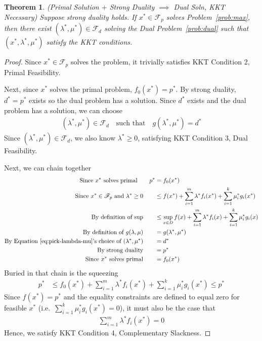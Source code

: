 \documentclass[12pt]{article}
\numberwithin{equation}{section} %
\theoremstyle{plain}
\newtheorem{thm}{Theorem}[section]
\theoremstyle{definition}
\theoremstyle{remark}
\begin{document}
\begin{thm}{\emph{(Primal Solution $+$ Strong Duality $\implies$ Dual
  Soln, KKT Necessary)}}
Suppose strong duality holds.  If $x^*\in\mathscr{F}_p$ solves
Problem~\ref{prob:max}, then there exist
$(\lambda^*,\mu^*)\in\mathscr{F}_d$ solving the Dual
Problem~\ref{prob:dual} such that $(x^*,\lambda^*,\mu^*)$ satisfy the
KKT conditions.
\end{thm}
\begin{proof}
Since $x^*\in\mathscr{F}_p$ solves the problem, it trivially satisfies
KKT Condition 2, Primal Feasibility.

Next, since $x^*$ solves the primal problem, $f_0(x^*)=p^*$. By strong
duality, $d^*=p^*$ exists so the dual problem has a solution. Since
$d^*$ exists and the dual problem has a solution, we can choose
\begin{align}
  \label{eq:pick-lambda-mu}
  (\lambda^*,\mu^*) \in \mathscr{F}_d
  \quad \text{such that}
  \quad g(\lambda^*,\mu^*) = d^*
\end{align}
Since $(\lambda^*,\mu^*)\in\mathscr{F}_d$, we also know $\lambda^*\geq
0$, satisfying KKT Condition 3, Dual Feasibility.

Next, we can chain together
\begin{align*}
  \text{Since $x^*$ solves primal} \qquad p^* &= f_0(x^*) \\
  \text{Since $x^*\in\mathscr{F}_p$ and $\lambda^*\geq 0$} \qquad
  &\leq f(x^*) + \sum^m_{i=1} \lambda^* f_i(x^*)
  + \sum^k_{i=1} \mu_i^* g_i(x^*) \\
  \text{By definition of sup} \qquad
  &\leq \sup_{x\in D} f(x) + \sum^m_{i=1} \lambda^* f_i(x)
  + \sum^k_{i=1} \mu_i^* g_i(x) \\
  \text{By definition of $g(\lambda,\mu)$} \qquad
  &= g(\lambda^*,\mu^*) \\
  \text{By Equation~\ref{eq:pick-lambda-mu}'s
    choice of $(\lambda^*,\mu^*)$} \qquad &= d^* \\
  \text{By strong duality}\qquad
  &= p^*\\
  \text{Since $x^*$ solves primal}\qquad
  &= f_0(x^*)
\end{align*}
Buried in that chain is the squeezing
\begin{align*}
  p^*
  &\leq f_0(x^*) + \sum^m_{i=1} \lambda^* f_i(x^*)
  + \sum^k_{i=1} \mu_i^* g_i(x^*)
  \leq p^*
\end{align*}
Since $f(x^*)=p^*$ and the equality constraints are defined to equal
zero for feasible $x^*$ (i.e.\ $\sum^k_{i=1}\mu^*_ig_i(x^*)=0$), it must
also be the case that
\begin{align*}
  \sum^m_{i=1} \lambda^* f_i(x^*)
  =0
\end{align*}
Hence, we satisfy KKT Condition 4, Complementary Slackness.


\end{proof}
\end{document}
